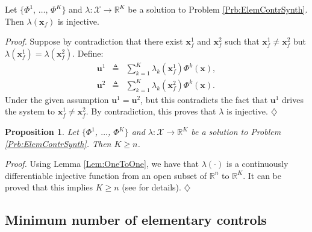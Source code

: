 \documentclass{svmult}
\newcommand{\x}{\mathbf {x}}
\newcommand{\ProofBegin}{{\em Proof.} }
\newcommand{\ProofEnd}{\hfill $\diamondsuit$\\}
\newtheorem{fact}[theorem]{Proposition}
\begin{document}
\begin{lemma} \label{Lem:OneToOne}
Let $\{\Phi^1$, $\dots$, $\Phi^K\}$ and $\lambda : \mathcal X
\rightarrow \mathbb R^K$ be a solution to
Problem \ref{Prb:ElemContrSynth}. Then $\lambda(\x_f)$ is injective.
\end{lemma}

\ProofBegin Suppose by contradiction that there exist 
$\mathbf x_f^1$ and $\mathbf x_f^2$ such
that $\mathbf x_f^1 \neq \mathbf x_f^2$ but $\lambda(\mathbf
x_f^1) = \lambda(\mathbf x_f^2)$. Define:
\begin{eqnarray}
\mathbf u^1 & \triangleq & \sum_{k=1}^K \lambda_k(\mathbf
x_f^1) \Phi^k(\mathbf x), \\ \mathbf u^2 & \triangleq &
\sum_{k=1}^K \lambda_k(\mathbf x_f^2) \Phi^k(\mathbf x).
\end{eqnarray}
Under the given assumption $\mathbf u^1 = \mathbf u^2$, but this
contradicts the fact that $\mathbf u^1$ drives the system to 
$\mathbf x_f^1 \neq \mathbf x_f^2$. By contradiction, this proves 
that $\lambda$ is injective. \ProofEnd

\begin{fact} \label{Pro:LowerBound}
Let $\{\Phi^1$, $\dots$, $\Phi^K\}$ and $\lambda : \mathcal X
\rightarrow \mathbb R^K$ be a solution to Problem
\ref{Prb:ElemContrSynth}. Then $K \geq n$.
\end{fact}

\ProofBegin Using Lemma \ref{Lem:OneToOne}, we have that
$\lambda(\cdot)$ is a continuously differentiable injective
function from an open subset of $\mathbb R^n$ to $\mathbb R^K$. It
can be proved that this implies $K \geq n$ (see \cite{Boothby} for 
details). \ProofEnd



\subsection{Minimum number of elementary controls} \label{Sec:MinNumPrimitivesNonLin}
\end{document}
